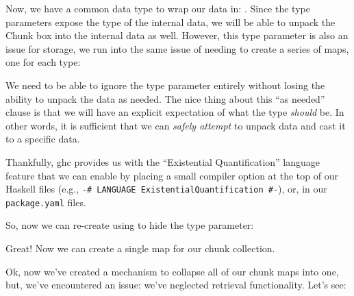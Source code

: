 \badUniversalChunkCarriage{}

Now, we have a common data type to wrap our data in: \Chunk{}. Since the type
parameters expose the type of the internal data, we will be able to unpack the
Chunk box into the internal data as well. However, this type parameter is also
an issue for storage, we run into the same issue of needing to create a series
of maps, one for each type:

\showingBadChunkWouldFailChunkDB{}

We need to be able to ignore the type parameter entirely without losing the
ability to unpack the data as needed. The nice thing about this ``as needed''
clause is that we will have an explicit expectation of what the type
\textit{should} be. In other words, it is sufficient that we can \textit{safely
attempt} to unpack data and cast it to a specific data.

Thankfully, \acs{ghc} provides us with the ``Existential Quantification''
language feature \cite{GHC2020ExistentialQuantification} that we can enable by
placing a small compiler option at the top of our Haskell files (e.g.,
\texttt{{-# LANGUAGE ExistentialQuantification #-}}), or, in our
\texttt{package.yaml} files. 

So, now we can re-create \Chunk{} using \ExistentialQuantification{} to hide the
type parameter:


\voidDataChunks{}

Great! Now we can create a single map for our chunk collection.

\voidDataChunkDB{}

Ok, now we've created a mechanism to collapse all of our chunk maps into one,
but, we've encountered an issue: we've neglected retrieval functionality. Let's
see:

\brokenChunkRetriever{}

